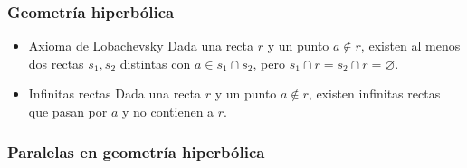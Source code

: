 \documentclass[11pt]{article}
\begin{document}
\subsubsection*{Geometría hiperbólica}
\label{sec-5-2-2}
\begin{itemize}
\item Axioma de Lobachevsky
\label{sec-5-2-2-1}
Dada una recta $r$ y un punto $a \notin r$, existen al menos dos rectas $s_1,s_2$
distintas con $a \in s_1\cap s_2$, pero $s_1\cap r = s_2\cap r = \varnothing$.

\item Infinitas rectas
\label{sec-5-2-2-2}
Dada una recta $r$ y un punto $a \notin r$, existen infinitas rectas que pasan
por $a$ y no contienen a $r$.
\end{itemize}

\subsubsection*{Paralelas en geometría hiperbólica}
\label{sec-5-2-3}
\end{document}
